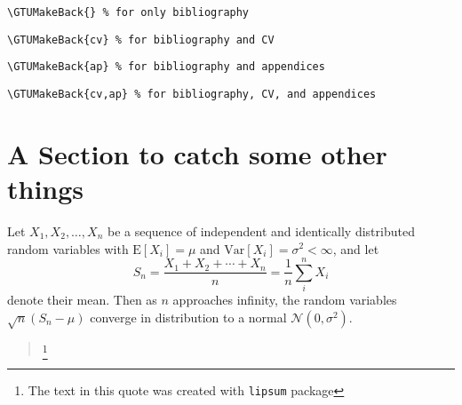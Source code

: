	\texttt{\textbackslash GTUMakeBack\{\} \% for only bibliography}
	
	\texttt{\textbackslash GTUMakeBack\{cv\} \% for bibliography and CV}
	
	\texttt{\textbackslash GTUMakeBack\{ap\} \% for bibliography and appendices}
	
	\texttt{\textbackslash GTUMakeBack\{cv,ap\} \% for bibliography, CV, and appendices}

\section{A Section to catch some other things}


Let $X_1, X_2, \ldots, X_n$ be a sequence of independent and identically distributed random variables with $\text{E}[X_i] = \mu$ and $\text{Var}[X_i] = \sigma^2 < \infty$, and let
\begin{equation}
    S_n = \frac{X_1 + X_2 + \cdots + X_n}{n}
      = \frac{1}{n}\sum_{i}^{n} X_i
\end{equation}
denote their mean. Then as $n$ approaches infinity, the random variables $\sqrt{n}(S_n - \mu)$ converge in distribution to a normal $\mathcal{N}(0, \sigma^2)$.

\begin{quote}
    \lipsum[10] \footnote{The text in this quote was created with \texttt{lipsum} package}
\end{quote}